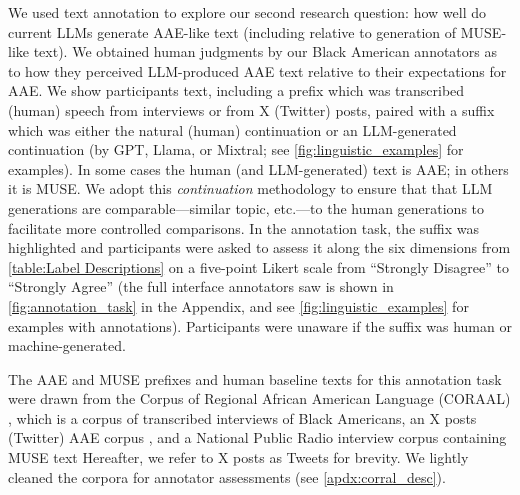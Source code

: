 

We used text annotation to explore our second research question: how well do current LLMs generate AAE-like text (including relative to generation of MUSE-like text). We obtained human judgments by our Black American annotators as to how they perceived LLM-produced AAE text relative to their expectations for AAE. 
We show participants text, including a prefix which was transcribed (human) speech from interviews or from X (Twitter) posts, paired with a suffix which was either the natural (human) continuation or an LLM-generated continuation (by GPT, Llama, or Mixtral; see \autoref{fig:linguistic_examples} for examples).
In some cases the human (and LLM-generated) text is AAE; in others it is MUSE.
We adopt this \textit{continuation} methodology to ensure that that LLM generations are comparable---similar topic, etc.---to the human generations to facilitate more controlled comparisons.
In the annotation task, the suffix was highlighted and participants were asked to assess it along the six dimensions from \autoref{table:Label Descriptions} on a five-point Likert scale from ``Strongly Disagree'' to ``Strongly Agree''
(the full interface annotators saw is shown in \autoref{fig:annotation_task} in the Appendix, and see \autoref{fig:linguistic_examples} for examples with annotations).
Participants were unaware if the suffix was human or machine-generated. %

 The AAE and MUSE prefixes and human baseline texts for this annotation task were drawn from the Corpus of Regional African American Language (CORAAL) \cite{KendallFarrington2023}, which is a corpus of transcribed interviews of Black Americans, an X posts (Twitter) AAE corpus \cite{aave_corpora}, and a National Public Radio interview corpus containing MUSE text \cite{majumder2020large,majumder2020open} %
 Hereafter, we refer to X posts as Tweets for brevity.
 We lightly cleaned the corpora for annotator assessments (see \autoref{apdx:corral_desc}). %

